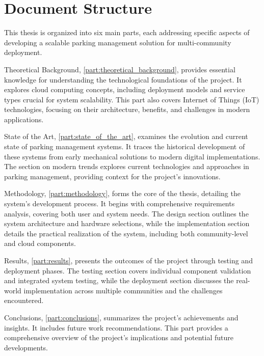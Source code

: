 \chapter{Document Structure}\label{ch:document_structure}

This thesis is organized into six main parts, each addressing specific aspects of developing a scalable parking management solution for multi-community deployment.

Theoretical Background, \cref{part:theoretical_background}, provides essential knowledge for understanding the technological foundations of the project. It explores cloud computing concepts, including deployment models and service types crucial for system scalability. This part also covers Internet of Things (IoT) technologies, focusing on their architecture, benefits, and challenges in modern applications.

State of the Art, \cref{part:state_of_the_art}, examines the evolution and current state of parking management systems. It traces the historical development of these systems from early mechanical solutions to modern digital implementations. The section on modern trends explores current technologies and approaches in parking management, providing context for the project's innovations.

Methodology, \cref{part:methodology}, forms the core of the thesis, detailing the system's development process. It begins with comprehensive requirements analysis, covering both user and system needs. The design section outlines the system architecture and hardware selections, while the implementation section details the practical realization of the system, including both community-level and cloud components.

Results, \cref{part:results}, presents the outcomes of the project through testing and deployment phases. The testing section covers individual component validation and integrated system testing, while the deployment section discusses the real-world implementation across multiple communities and the challenges encountered.

Conclusions, \cref{part:conclusions}, summarizes the project's achievements and insights. It includes future work recommendations. This part provides a comprehensive overview of the project's implications and potential future developments.
